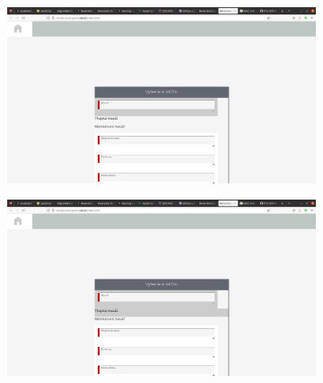 \begin{figure}[h]
    \begin{subfigure}{.5\textwidth}
        \centering
        \includegraphics[width=.8\linewidth]{doc/latex/fig/implementation/client/step3.png}
        \caption{}
        \label{fig:step1}
    \end{subfigure}
    \begin{subfigure}{.5\textwidth}
        \centering
        \includegraphics[width=.8\linewidth]{doc/latex/fig/implementation/client/step4.png}
        \caption{}
        \label{fig:step2}
    \end{subfigure}
    \label{fig:steps2}
\end{figure}

